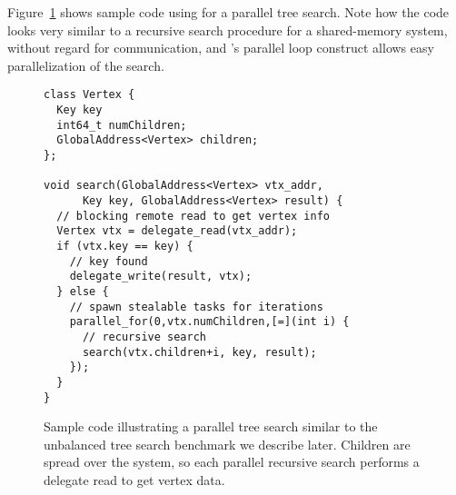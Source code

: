 
Figure~\ref{fig:sample} shows sample code using \Grappa for a parallel tree
search. Note how the code looks very similar to a recursive search procedure for a shared-memory system, without regard for communication, and \Grappa's parallel loop construct allows easy parallelization of the search.

\begin{figure}[htbp]
\begin{center}
\begin{scriptsize}
\begin{lstlisting}[style=grappa]
class Vertex {
  Key key
  int64_t numChildren;
  GlobalAddress<Vertex> children;
};

void search(GlobalAddress<Vertex> vtx_addr,
      Key key, GlobalAddress<Vertex> result) {
  // blocking remote read to get vertex info
  Vertex vtx = delegate_read(vtx_addr);
  if (vtx.key == key) {
    // key found
    delegate_write(result, vtx);
  } else {
    // spawn stealable tasks for iterations
    parallel_for(0,vtx.numChildren,[=](int i) {
      // recursive search
      search(vtx.children+i, key, result);       
    });
  }
}
\end{lstlisting}
\end{scriptsize}

    \begin{minipage}{\columnwidth}
      \caption{\label{fig:sample} Sample \Grappa code illustrating a
        parallel tree search similar to the unbalanced tree search
        benchmark we describe later. Children are spread over the system, so each parallel recursive search performs a delegate read to get vertex data.
      }
    \end{minipage}

\end{center}
\end{figure}


